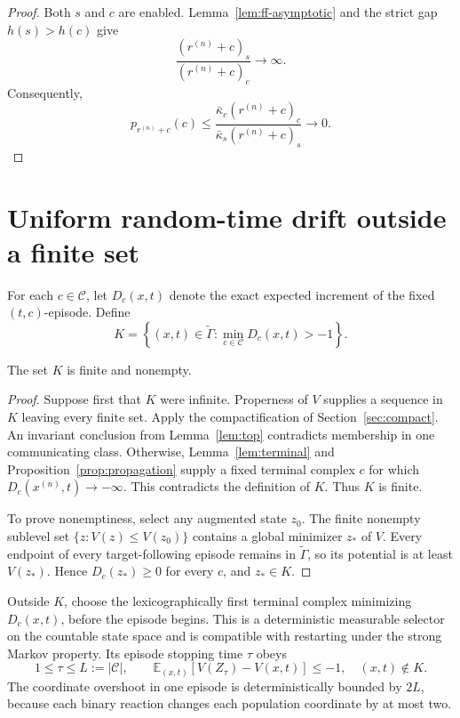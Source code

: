 \begin{proof}
Both \(s\) and \(c\) are enabled.  Lemma~\ref{lem:ff-asymptotic} and the
strict gap \(h(s)>h(c)\) give
\[
  \frac{(r^{(n)}+c)_s}{(r^{(n)}+c)_c}\longrightarrow\infty.
\]
Consequently,
\[
 p_{r^{(n)}+c}(c)
 \le
 \frac{\bar\kappa_c(r^{(n)}+c)_c}
      {\bar\kappa_s(r^{(n)}+c)_s}
 \longrightarrow0.
\]
\end{proof}

\section{Uniform random-time drift outside a finite set}\label{sec:uniform}

For each \(c\in\mathcal C\), let \(D_c(x,t)\) denote the exact expected
increment of the fixed \((t,c)\)-episode.  Define
\begin{equation}\label{eq:K}
 K=\left\{(x,t)\in\widetilde\Gamma:
          \min_{c\in\mathcal C}D_c(x,t)>-1\right\}.
\end{equation}

\begin{proposition}\label{prop:K}
The set \(K\) is finite and nonempty.
\end{proposition}

\begin{proof}
Suppose first that \(K\) were infinite.  Properness of \(V\) supplies a
sequence in \(K\) leaving every finite set.  Apply the compactification of
Section~\ref{sec:compact}.  An invariant conclusion from
Lemma~\ref{lem:top} contradicts membership in one communicating class.
Otherwise, Lemma~\ref{lem:terminal} and
Proposition~\ref{prop:propagation} supply a fixed terminal complex \(c\) for
which \(D_c(x^{(n)},t)\to-\infty\).  This contradicts the definition of
\(K\).  Thus \(K\) is finite.

To prove nonemptiness, select any augmented state \(z_0\).  The finite
nonempty sublevel set \(\{z:V(z)\le V(z_0)\}\) contains a global minimizer
\(z_*\) of \(V\).  Every endpoint of every target-following episode remains
in \(\widetilde\Gamma\), so its potential is at least \(V(z_*)\).  Hence
\(D_c(z_*)\ge0\) for every \(c\), and \(z_*\in K\).
\end{proof}

Outside \(K\), choose the lexicographically first terminal complex minimizing
\(D_c(x,t)\), before the episode begins.  This is a deterministic measurable
selector on the countable state space and is compatible with restarting
under the strong Markov property.  Its episode stopping time \(\tau\) obeys
\begin{equation}\label{eq:episode-drift}
  1\le\tau\le L:=|\mathcal C|,
  \qquad
  \mathbb E_{(x,t)}[V(Z_\tau)-V(x,t)]\le-1,
  \quad (x,t)\notin K.
\end{equation}
The coordinate overshoot in one episode is deterministically bounded by
\(2L\), because each binary reaction changes each population coordinate by
at most two.

